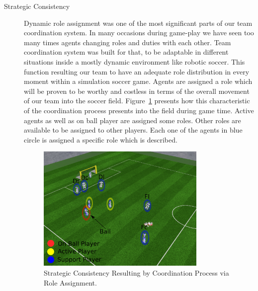 \begin{description}
\item[Strategic Consistency]
Dynamic role assignment was one of the most significant parts of our team coordination system. In many occasions during game-play we have seen too many times agents changing roles and duties with each other. Team coordination system was built for that, to be adaptable in different situations inside a mostly dynamic environment like robotic soccer. This function resulting our team to have an adequate role distribution in every moment within a simulation soccer game. Agents are assigned a role which will be proven to be worthy and costless in terms of the overall movement of our team into the soccer field. Figure~\ref{fig:StrategicPositioning} presents how this characteristic of the coordination process presents into the field during game time. Active agents as well as on ball player are assigned some roles. Other roles are available to be assigned to other players. Each one of the agents in blue circle is assigned a specific role which is described.

\begin{figure}[h!]
\centering
  \includegraphics[width=0.8\textwidth]{Chapter5/figures/4.pdf}
  \caption{Strategic Consistency Resulting by Coordination Process via Role Assignment.} 
  \label{fig:StrategicPositioning}
\end{figure}

\end{description}



